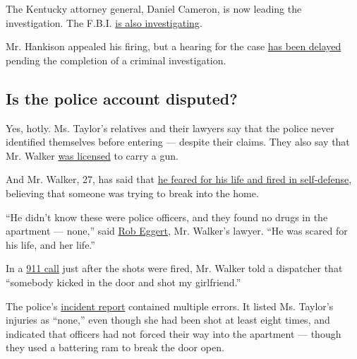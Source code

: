 The Kentucky attorney general, Daniel Cameron, is now leading the
investigation. The F.B.I.
\href{https://www.nytimes.com/2020/05/21/us/fbi-louisville-shooting.html}{is
also investigating}.

Mr. Hankison appealed his firing, but a hearing for the case
\href{https://www.wdrb.com/news/appeal-delayed-for-fired-lmpd-officer-involved-in-breonna-taylor-raid/article_bf3e5ea8-c602-11ea-9ce8-db2edd607e3a.html}{has
been delayed} pending the completion of a criminal investigation.

\hypertarget{is-the-police-account-disputed}{%
\subsection{Is the police account
disputed?}\label{is-the-police-account-disputed}}

Yes, hotly. Ms. Taylor's relatives and their lawyers say that the police
never identified themselves before entering --- despite their claims.
They also say that Mr. Walker
\href{https://www.nytimes.com/2020/05/14/us/breonna-taylor-louisville-shooting.html}{was
licensed} to carry a gun.

And Mr. Walker, 27, has said that
\href{https://www.courier-journal.com/story/news/crime/2020/05/13/breonna-taylor-lawyer-says-louisville-police-need-to-get-story-straight/5183137002/}{he
feared for his life and fired in self-defense}, believing that someone
was trying to break into the home.

``He didn't know these were police officers, and they found no drugs in
the apartment --- none,'' said
\href{https://www.nytimes.com/2020/05/22/us/Breonna-Taylor-Kenneth-Walker.html}{Rob
Eggert}, Mr. Walker's lawyer. ``He was scared for his life, and her
life.''

In a
\href{https://www.nytimes.com/2020/05/29/us/louisville-protest-shooting-breonna-taylor.html}{911
call} just after the shots were fired, Mr. Walker told a dispatcher that
``somebody kicked in the door and shot my girlfriend.''

The police's
\href{https://www.scribd.com/document/465105285/Breonna-Taylor-Incident-Report\#from_embed?campaign=SkimbitLtd\&ad_group=1025X1162200X37e14a5d9156059be0d5da4023a17e62\&keyword=660149026\&source=hp_affiliate\&medium=affiliate}{incident
report} contained multiple errors. It listed Ms. Taylor's injuries as
``none,'' even though she had been shot at least eight times, and
indicated that officers had not forced their way into the apartment ---
though they used a battering ram to break the door open.

